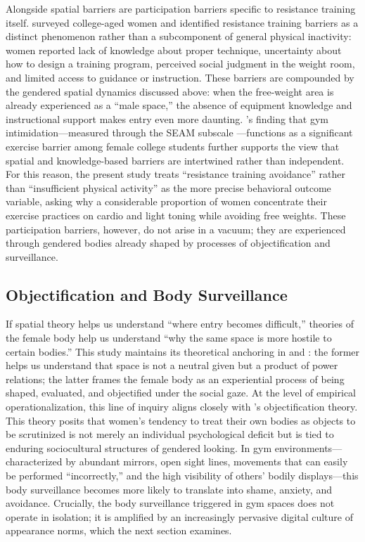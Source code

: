 Alongside spatial barriers are participation barriers specific to resistance training itself.
\textcite{peters2019barriers} surveyed college-aged women and identified resistance training barriers as a distinct phenomenon rather than a subcomponent of general physical inactivity: women reported lack of knowledge about proper technique, uncertainty about how to design a training program, perceived social judgment in the weight room, and limited access to guidance or instruction.
These barriers are compounded by the gendered spatial dynamics discussed above: when the free-weight area is already experienced as a ``male space,'' the absence of equipment knowledge and instructional support makes entry even more daunting.
\textcite{rendall2024gym}'s finding that gym intimidation---measured through the SEAM subscale \parencite{levinson2013seam}---functions as a significant exercise barrier among female college students further supports the view that spatial and knowledge-based barriers are intertwined rather than independent.
For this reason, the present study treats ``resistance training avoidance'' rather than ``insufficient physical activity'' as the more precise behavioral outcome variable, asking why a considerable proportion of women concentrate their exercise practices on cardio and light toning while avoiding free weights.
These participation barriers, however, do not arise in a vacuum; they are experienced through gendered bodies already shaped by processes of objectification and surveillance.

\subsection{Objectification and Body Surveillance}

If spatial theory helps us understand ``where entry becomes difficult,'' theories of the female body help us understand ``why the same space is more hostile to certain bodies.''
This study maintains its theoretical anchoring in \textcite{lefebvre1991production} and \textcite{beauvoir1949second}:
the former helps us understand that space is not a neutral given but a product of power relations; the latter frames the female body as an experiential process of being shaped, evaluated, and objectified under the social gaze.
At the level of empirical operationalization, this line of inquiry aligns closely with \textcite{fredrickson1997objectification}'s objectification theory.
This theory posits that women's tendency to treat their own bodies as objects to be scrutinized is not merely an individual psychological deficit but is tied to enduring sociocultural structures of gendered looking.
In gym environments---characterized by abundant mirrors, open sight lines, movements that can easily be performed ``incorrectly,'' and the high visibility of others' bodily displays---this body surveillance becomes more likely to translate into shame, anxiety, and avoidance.
Crucially, the body surveillance triggered in gym spaces does not operate in isolation; it is amplified by an increasingly pervasive digital culture of appearance norms, which the next section examines.

